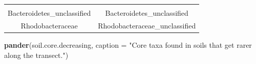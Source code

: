 \documentclass[]{article}
\newenvironment{Shaded}{\begin{snugshade}}{\end{snugshade}}
\newcommand{\KeywordTok}[1]{\textcolor[rgb]{0.13,0.29,0.53}{\textbf{#1}}}
\newcommand{\DataTypeTok}[1]{\textcolor[rgb]{0.13,0.29,0.53}{#1}}
\newcommand{\StringTok}[1]{\textcolor[rgb]{0.31,0.60,0.02}{#1}}
\newcommand{\NormalTok}[1]{#1}
\begin{document}
\begin{longtable}[]{@{}cc@{}}
\begin{minipage}[t]{0.43\columnwidth}
\end{minipage}\tabularnewline
\begin{minipage}[t]{0.41\columnwidth}\centering\strut
Bacteroidetes\_unclassified\strut
\end{minipage} & \begin{minipage}[t]{0.43\columnwidth}\centering\strut
Bacteroidetes\_unclassified\strut
\end{minipage}\tabularnewline
\begin{minipage}[t]{0.41\columnwidth}\centering\strut
Rhodobacteraceae\strut
\end{minipage} & \begin{minipage}[t]{0.43\columnwidth}\centering\strut
Rhodobacteraceae\_unclassified\strut
\end{minipage}\tabularnewline
\bottomrule
\end{longtable}

\begin{Shaded}
\begin{Highlighting}[]
\KeywordTok{pander}\NormalTok{(soil.core.decreasing, }\DataTypeTok{caption =} \StringTok{"Core taxa found in soils that get rarer along the transect."}\NormalTok{)}
\end{Highlighting}
\end{Shaded}
\end{document}
